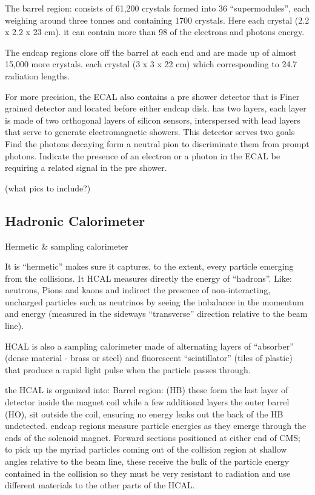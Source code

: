 The barrel region: consists of 61,200 crystals formed into 36 “supermodules”, each weighing around three tonnes and containing 1700 crystals. Here each crystal (2.2 x 2.2 x 23 cm). it can contain more than 98 of the electrons and photons energy.  

The endcap regions close off the barrel at each end and are made up of almost 15,000 more crystals. each crystal (3 x 3 x 22 cm) which corresponding to 24.7 radiation lengths.   

For more precision, the ECAL also contains a pre shower detector that is Finer grained detector and located before either endcap disk.  has two layers, each layer is made of two orthogonal layers of silicon sensors, interspersed with lead layers that serve to generate electromagnetic showers. This detector serves two goals Find the photons decaying form a neutral pion to discriminate them from prompt photons.  Indicate the presence of an electron or a photon in the ECAL be requiring a related signal in the pre shower. 

(what pics to include?)  

\subsection{Hadronic Calorimeter}


Hermetic & sampling calorimeter 

It is “hermetic” makes sure it captures, to the extent, every particle emerging from the collisions. It HCAL measures directly the energy of “hadrons”. Like: neutrons, Pions and kaons and indirect the presence of non-interacting, uncharged particles such as neutrinos by seeing the imbalance in the momentum and energy (measured in the sideways “transverse” direction relative to the beam line). 

HCAL is also a sampling calorimeter made of alternating layers of “absorber” (dense material - brass or steel) and fluorescent “scintillator” (tiles of plastic) that produce a rapid light pulse when the particle passes through.

the HCAL is organized into: Barrel region: (HB) these form the last layer of detector inside the magnet coil while a few additional layers the outer barrel (HO), sit outside the coil, ensuring no energy leaks out the back of the HB undetected. endcap regions measure particle energies as they emerge through the ends of the solenoid magnet. Forward sections positioned at either end of CMS; to pick up the myriad particles coming out of the collision region at shallow angles relative to the beam line, these receive the bulk of the particle energy contained in the collision so they must be very resistant to radiation and use different materials to the other parts of the HCAL.

